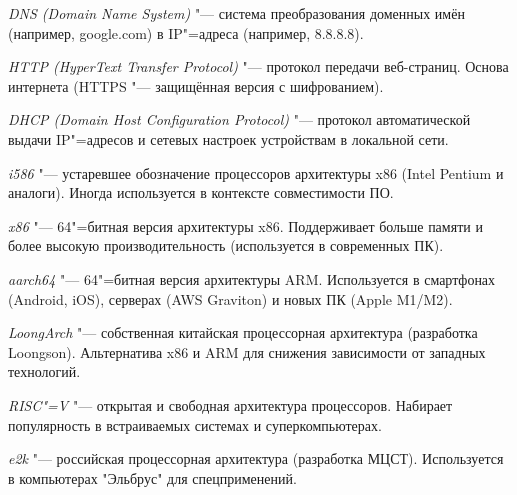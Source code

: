 \documentclass{article}
\begin{document}
\textit{DNS (Domain Name System)} "--- система преобразования доменных имён (например, google.com) в IP"=адреса (например, 8.8.8.8).
	
\textit{HTTP (HyperText Transfer Protocol)} "--- протокол передачи веб-страниц. Основа интернета (HTTPS "--- защищённая версия с шифрованием).
	
\textit{DHCP (Domain Host Configuration Protocol)} "--- протокол автоматической выдачи IP"=адресов и сетевых настроек устройствам в локальной сети.

\textit{i586} "--- устаревшее обозначение процессоров архитектуры x86 (Intel Pentium и аналоги). Иногда используется в контексте совместимости ПО.
	
\textit{x86} "--- 64"=битная версия архитектуры x86. Поддерживает больше памяти и более высокую производительность (используется в современных ПК).
	
\textit{aarch64} "--- 64"=битная версия архитектуры ARM. Используется в смартфонах (Android, iOS), серверах (AWS Graviton) и новых ПК (Apple M1/M2).
	
\textit{LoongArch} "--- собственная китайская процессорная архитектура (разработка Loongson). Альтернатива x86 и ARM для снижения зависимости от западных технологий.
	
\textit{RISC"=V} "--- открытая и свободная архитектура процессоров. Набирает популярность в встраиваемых системах и суперкомпьютерах.
	
\textit{e2k} "--- российская процессорная архитектура (разработка МЦСТ). Используется в компьютерах "Эльбрус" для спецприменений.
\end{document}
